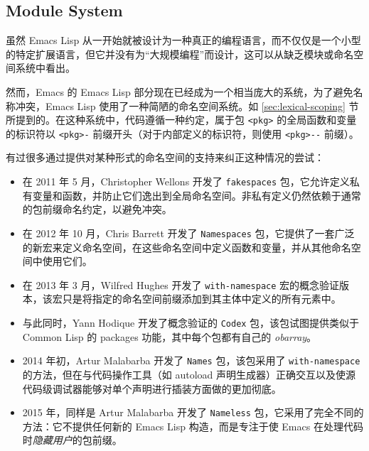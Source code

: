 \documentclass[format=acmsmall,screen]{acmart}
\begin{document}

\subsection{Module System}
\label{sec:module-system}

虽然 Emacs Lisp 从一开始就被设计为一种真正的编程语言，而不仅仅是一个小型的特定扩展语言，但它并没有为“大规模编程”而设计，这可以从缺乏模块或命名空间系统中看出。

然而，Emacs 的 Emacs Lisp 部分现在已经成为一个相当庞大的系统，为了避免名称冲突，Emacs Lisp 使用了一种简陋的命名空间系统。如 \ref{sec:lexical-scoping} 节所提到的。在这种系统中，代码遵循一种约定，属于包 \verb|<pkg>| 的全局函数和变量的标识符以 \verb|<pkg>-| 前缀开头（对于内部定义的标识符，则使用 \verb|<pkg>--| 前缀）。

有过很多通过提供对某种形式的命名空间的支持来纠正这种情况的尝试：

\begin{itemize}
\item 在 2011 年 5 月，Christopher Wellons 开发了 \texttt{fakespaces} 包，它允许定义私有变量和函数，并防止它们逸出到全局命名空间。非私有定义仍然依赖于通常的包前缀命名约定，以避免冲突。
\item 在 2012 年 10 月，Chris Barrett 开发了 \texttt{Namespaces} 包，它提供了一套广泛的新宏来定义命名空间，在这些命名空间中定义函数和变量，并从其他命名空间中使用它们。
\item 在 2013 年 3 月，Wilfred Hughes 开发了 \texttt{with-namespace} 宏的概念验证版本，该宏只是将指定的命名空间前缀添加到其主体中定义的所有元素中。
\item 与此同时，Yann Hodique 开发了概念验证的 \texttt{Codex} 包，该包试图提供类似于 Common Lisp 的 packages 功能，其中每个包都有自己的 \emph{obarray}。
\item 2014 年初，Artur Malabarba 开发了 \texttt{Names} 包，该包采用了 \texttt{with-namespace} 的方法，但在与代码操作工具（如 autoload 声明生成器）正确交互以及使源代码级调试器能够对单个声明进行插装方面做的更加彻底。
\item 2015 年，同样是 Artur Malabarba 开发了 \texttt{Nameless} 包，它采用了完全不同的方法：它不提供任何新的 Emacs Lisp 构造，而是专注于使 Emacs 在处理代码时\emph{隐藏用户}的包前缀。
\end{itemize}
\end{document}
